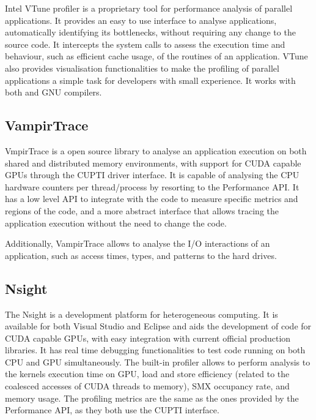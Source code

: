 Intel VTune profiler \cite{Intel:VTune} is a proprietary tool for performance analysis of parallel applications. It provides an easy to use interface to analyse applications, automatically identifying its bottlenecks, without requiring any change to the source code. It intercepts the system calls to assess the execution time and behaviour, such as efficient cache usage, of the routines of an application. VTune also provides visualisation functionalities to make the profiling of parallel applications a simple task for developers with small experience. It works with both \intel and GNU compilers.

\subsection*{VampirTrace}

VmpirTrace \cite{VampirTrace} is a open source library to analyse an application execution on both shared and distributed memory environments, with support for CUDA capable GPUs through the CUPTI driver interface. It is capable of analysing the CPU hardware counters per thread/process by resorting to the Performance API. It has a low level API to integrate with the code to measure specific metrics and regions of the code, and a more abstract interface that allows tracing the application execution without the need to change the code.

Additionally, VampirTrace allows to analyse the I/O interactions of an application, such as access times, types, and patterns to the hard drives.

\subsection*{\nvidia Nsight}

The \nvidia Nsight \cite{NVIDIA:Nsight} is a development platform for heterogeneous computing. It is available for both Visual Studio and Eclipse and aids the development of code for CUDA capable GPUs, with easy integration with current official production libraries. It has real time debugging functionalities to test code running on both CPU and GPU simultaneously. The built-in profiler allows to perform analysis to the kernels execution time on GPU, load and store efficiency (related to the coalesced accesses of CUDA threads to memory), SMX occupancy rate, and memory usage. The profiling metrics are the same as the ones provided by the Performance API, as they both use the \nvidia CUPTI interface.
